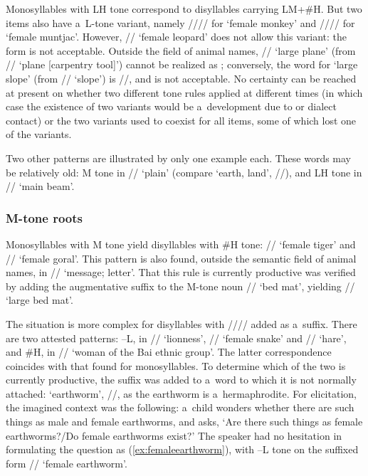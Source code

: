 	Monosyllables with LH tone correspond to disyllables carrying LM+\#H. But two items also
	have a~L-tone variant, namely //{\kern2pt}// for ‘female monkey’ and
	//{\kern2pt}// for ‘female muntjac’. However, // ‘female
	leopard’ does not allow this variant: the form  is not acceptable. Outside the field
	of animal names, // ‘large plane’ (from // ‘plane [carpentry tool]’)
	cannot be realized as ; conversely, the word for ‘large slope’ (from //
	‘slope’) is //, and  is not acceptable. No certainty can be reached
	at present on whether two different tone rules applied at different times (in which case the
	existence of two variants would be a~development due to  or dialect contact) or the
	two variants used to coexist for all items, some of which lost one of the variants. %
	
	Two other patterns are illustrated by only one example each. These words may be relatively old: M tone
	in // ‘plain’ (compare ‘earth, land’, //), and LH tone in //
	‘main beam’.
	
	\subsubsection{M-tone roots}
	\label{sec:mtoneroots}
	
	Monosyllables with M tone yield disyllables with \#H tone: // ‘female tiger’ and
	// ‘female goral’. This pattern is also found, outside the semantic field of animal
	names, in // ‘message; letter’. That this rule is currently productive was verified
	by adding the augmentative suffix to the M-tone noun // ‘bed mat’, yielding // ‘large bed mat’.
	
	The situation is more complex for disyllables with //// added as a~suffix. There are two attested patterns: --L, in //
	‘lionness’, // ‘female snake’ and // ‘hare’, and \#H, in
	// ‘woman of the Bai ethnic group’. The latter {correspondence} coincides with that
	found for monosyllables. To determine which of the two is currently productive, the suffix was added
	to a~word to which it is not normally attached: ‘earthworm’, //, as the earthworm is a~hermaphrodite. For elicitation, the imagined context was the following: a~child wonders whether there are such things as male and female earthworms, and asks, ‘Are
	there such things as female earthworms?/Do female earthworms exist?’ The speaker had no hesitation in formulating
	the {question} as (\ref{ex:femaleearthworm}), with --L tone on the suffixed form
	// ‘female earthworm’.
	
